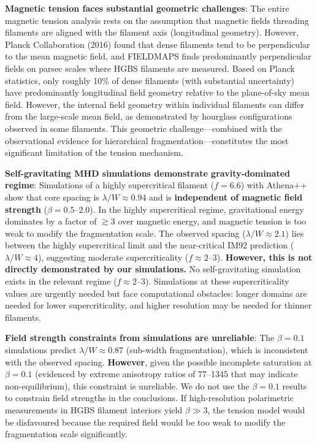 \documentclass[11pt,a4paper]{article}
\begin{document}
\begin{enumerate}
    \textbf{Magnetic tension faces substantial geometric challenges}: The entire magnetic tension analysis rests on the assumption that magnetic fields threading filaments are aligned with the filament axis (longitudinal geometry). However, Planck Collaboration (2016) found that dense filaments tend to be perpendicular to the mean magnetic field, and FIELDMAPS finds predominantly perpendicular fields on parsec scales where HGBS filaments are measured. Based on Planck statistics, only roughly 10\% of dense filaments (with substantial uncertainty) have predominantly longitudinal field geometry relative to the plane-of-sky mean field. However, the internal field geometry within individual filaments can differ from the large-scale mean field, as demonstrated by hourglass configurations observed in some filaments. This geometric challenge—combined with the observational evidence for hierarchical fragmentation—constitutes the most significant limitation of the tension mechanism.

    \textbf{Self-gravitating MHD simulations demonstrate gravity-dominated regime}: Simulations of a highly supercritical filament ($f = 6.6$) with Athena++ show that core spacing is $\lambda/W \approx 0.94$ and is \textbf{independent of magnetic field strength} ($\beta = 0.5$--$2.0$). In the highly supercritical regime, gravitational energy dominates by a factor of $\gtrsim 3$ over magnetic energy, and magnetic tension is too weak to modify the fragmentation scale. The observed spacing ($\lambda/W \approx 2.1$) lies between the highly supercritical limit and the near-critical IM92 prediction ($\lambda/W \approx 4$), suggesting moderate supercriticality ($f \approx 2$--$3$). \textbf{However, this is not directly demonstrated by our simulations.} No self-gravitating simulation exists in the relevant regime ($f \approx 2$--$3$). Simulations at these supercriticality values are urgently needed but face computational obstacles: longer domains are needed for lower supercriticality, and higher resolution may be needed for thinner filaments.

    \textbf{Field strength constraints from simulations are unreliable}: The $\beta = 0.1$ simulations predict $\lambda/W \approx 0.87$ (sub-width fragmentation), which is inconsistent with the observed spacing. \textbf{However}, given the possible incomplete saturation at $\beta = 0.1$ (evidenced by extreme anisotropy ratios of 77--1345 that may indicate non-equilibrium), this constraint is unreliable. We do not use the $\beta = 0.1$ results to constrain field strengths in the conclusions. If high-resolution polarimetric measurements in HGBS filament interiors yield $\beta \gg 3$, the tension model would be disfavoured because the required field would be too weak to modify the fragmentation scale significantly.


\end{enumerate}
\end{document}
